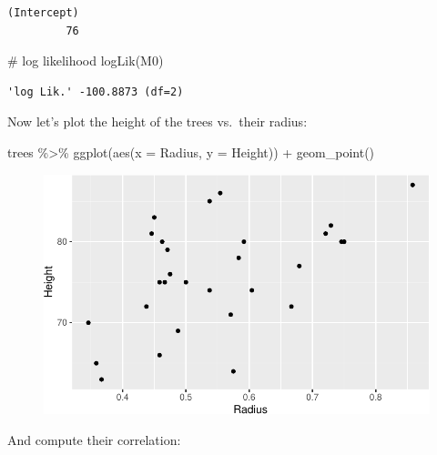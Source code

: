 \documentclass[
  letterpaper,
  DIV=11,
  numbers=noendperiod]{scrreprt}
\newenvironment{Shaded}{\begin{snugshade}}{\end{snugshade}}
\newcommand{\AttributeTok}[1]{\textcolor[rgb]{0.40,0.45,0.13}{#1}}
\newcommand{\CommentTok}[1]{\textcolor[rgb]{0.37,0.37,0.37}{#1}}
\newcommand{\FunctionTok}[1]{\textcolor[rgb]{0.28,0.35,0.67}{#1}}
\newcommand{\NormalTok}[1]{\textcolor[rgb]{0.00,0.23,0.31}{#1}}
\newcommand{\SpecialCharTok}[1]{\textcolor[rgb]{0.37,0.37,0.37}{#1}}
\begin{document}
\begin{verbatim}
(Intercept) 
         76 
\end{verbatim}

\begin{Shaded}
\begin{Highlighting}[]
\CommentTok{\# log likelihood}
\FunctionTok{logLik}\NormalTok{(M0)}
\end{Highlighting}
\end{Shaded}

\begin{verbatim}
'log Lik.' -100.8873 (df=2)
\end{verbatim}

Now let's plot the height of the trees vs.~their radius:

\begin{Shaded}
\begin{Highlighting}[]
\NormalTok{trees }\SpecialCharTok{\%\textgreater{}\%} \FunctionTok{ggplot}\NormalTok{(}\FunctionTok{aes}\NormalTok{(}\AttributeTok{x =}\NormalTok{ Radius, }\AttributeTok{y =}\NormalTok{ Height)) }\SpecialCharTok{+} 
  \FunctionTok{geom\_point}\NormalTok{()}
\end{Highlighting}
\end{Shaded}

\begin{figure}[H]

{\centering \includegraphics{./10-model_selection_files/figure-pdf/unnamed-chunk-6-1.pdf}

}

\end{figure}

And compute their correlation:

\begin{Shaded}
\end{Shaded}
\end{document}
